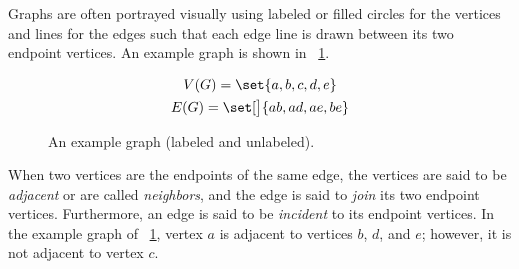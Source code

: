 Graphs are often portrayed visually using labeled or filled circles for the vertices and lines for the edges such
that each edge line is drawn between its two endpoint vertices.  An example graph is shown in
\figurename~\ref{fig:exgraph}.

\begin{figure}[H]
  \begin{minipage}{2.75in}
    \vspace{0in}
    \centering
  \end{minipage}
  \begin{minipage}{2.75in}
    \vspace{0in}
    \centering
  \end{minipage}
  \begin{gather*}
    V(G)=\set{a,b,c,d,e} \\
    E(G)=\set[\big]{ab,ad,ae,be}
  \end{gather*}
  \vspace{-2\baselineskip}
  \caption{An example graph (labeled and unlabeled).}
  \label{fig:exgraph}
\end{figure}

When two vertices are the endpoints of the same edge, the vertices are said to be \emph{adjacent} or are called
\emph{neighbors}, and the edge is said to \emph{join} its two endpoint vertices.  Furthermore, an edge is said to
be \emph{incident} to its endpoint vertices.  In the example graph of \figurename~\ref{fig:exgraph}, vertex \(a\)
is adjacent to vertices \(b\), \(d\), and \(e\); however, it is not adjacent to vertex \(c\).

